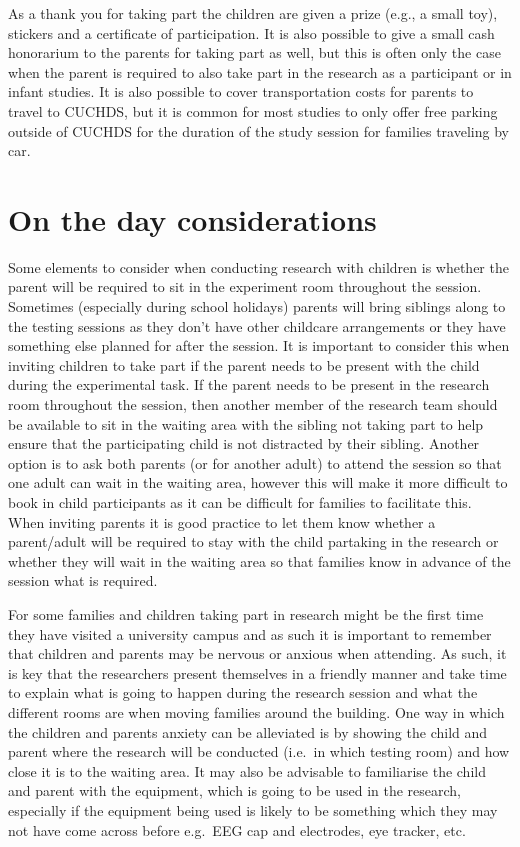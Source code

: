 \documentclass[
  12pt,
]{book}
\begin{document}
As a thank you for taking part the children are given a prize (e.g., a small toy), stickers and a certificate of participation. It is also possible to give a small cash honorarium to the parents for taking part as well, but this is often only the case when the parent is required to also take part in the research as a participant or in infant studies. It is also possible to cover transportation costs for parents to travel to CUCHDS, but it is common for most studies to only offer free parking outside of CUCHDS for the duration of the study session for families traveling by car.

\section{On the day considerations}\label{on-the-day-considerations}

Some elements to consider when conducting research with children is whether the parent will be required to sit in the experiment room throughout the session. Sometimes (especially during school holidays) parents will bring siblings along to the testing sessions as they don't have other childcare arrangements or they have something else planned for after the session. It is important to consider this when inviting children to take part if the parent needs to be present with the child during the experimental task. If the parent needs to be present in the research room throughout the session, then another member of the research team should be available to sit in the waiting area with the sibling not taking part to help ensure that the participating child is not distracted by their sibling. Another option is to ask both parents (or for another adult) to attend the session so that one adult can wait in the waiting area, however this will make it more difficult to book in child participants as it can be difficult for families to facilitate this. When inviting parents it is good practice to let them know whether a parent/adult will be required to stay with the child partaking in the research or whether they will wait in the waiting area so that families know in advance of the session what is required.

For some families and children taking part in research might be the first time they have visited a university campus and as such it is important to remember that children and parents may be nervous or anxious when attending. As such, it is key that the researchers present themselves in a friendly manner and take time to explain what is going to happen during the research session and what the different rooms are when moving families around the building. One way in which the children and parents anxiety can be alleviated is by showing the child and parent where the research will be conducted (i.e.~in which testing room) and how close it is to the waiting area. It may also be advisable to familiarise the child and parent with the equipment, which is going to be used in the research, especially if the equipment being used is likely to be something which they may not have come across before e.g.~EEG cap and electrodes, eye tracker, etc.
\end{document}
